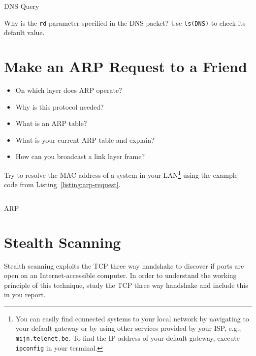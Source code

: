 \documentclass[11pt,a4paper]{article}
\begin{document}
\begin{listing}[h]
\inputminted[firstline=16]{python}{../code_students/dns_query.py}
\caption{DNS Query}\label{listing:dns-query}
\end{listing}

\begin{question}
    Why is the \texttt{rd} parameter specified in the DNS packet? Use \texttt{ls(DNS)} to check its default value.
\end{question}



\FloatBarrier
\section{Make an ARP Request to a Friend}
\begin{question}
\begin{itemize}
    \item On which layer does ARP operate?
    \item Why is this protocol needed?
    \item What is an ARP table?
    \item What is your current ARP table and explain?
    \item How can you broadcast a link layer frame?
\end{itemize}
\end{question}

\begin{question}
Try to resolve the MAC address of a system in your LAN\footnote{You can easily find connected systems to your local network by navigating to your default gateway or by using other services provided by your ISP, e.g., \texttt{mijn.telenet.be}. To find the IP address of your default gateway, execute  \texttt{ipconfig} in your terminal.} using the example code from Listing~\ref{listing:arp-request}.
\end{question}



\begin{listing}[h]
    \inputminted{python}{../code_students/example-arp.py}
\caption{ARP}\label{listing:arp-request}
\end{listing}

\FloatBarrier
\section{Stealth Scanning}
Stealth scanning exploits the TCP three way handshake to discover if ports are open on an Internet-accessible computer. In order to understand the working principle of this technique, study the TCP three way handshake and include this in you report.
\end{document}
